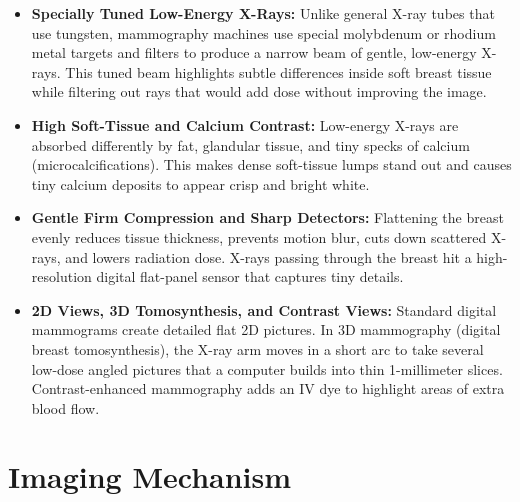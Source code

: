 \begin{itemize}
    \item \textbf{Specially Tuned Low-Energy X-Rays:} Unlike general X-ray tubes that use tungsten, mammography machines use special molybdenum or rhodium metal targets and filters to produce a narrow beam of gentle, low-energy X-rays. This tuned beam highlights subtle differences inside soft breast tissue while filtering out rays that would add dose without improving the image.
    \item \textbf{High Soft-Tissue and Calcium Contrast:} Low-energy X-rays are absorbed differently by fat, glandular tissue, and tiny specks of calcium (microcalcifications). This makes dense soft-tissue lumps stand out and causes tiny calcium deposits to appear crisp and bright white.
    \item \textbf{Gentle Firm Compression and Sharp Detectors:} Flattening the breast evenly reduces tissue thickness, prevents motion blur, cuts down scattered X-rays, and lowers radiation dose. X-rays passing through the breast hit a high-resolution digital flat-panel sensor that captures tiny details.
    \item \textbf{2D Views, 3D Tomosynthesis, and Contrast Views:} Standard digital mammograms create detailed flat 2D pictures. In 3D mammography (digital breast tomosynthesis), the X-ray arm moves in a short arc to take several low-dose angled pictures that a computer builds into thin 1-millimeter slices. Contrast-enhanced mammography adds an IV dye to highlight areas of extra blood flow.
\end{itemize}

\section{Imaging Mechanism}

